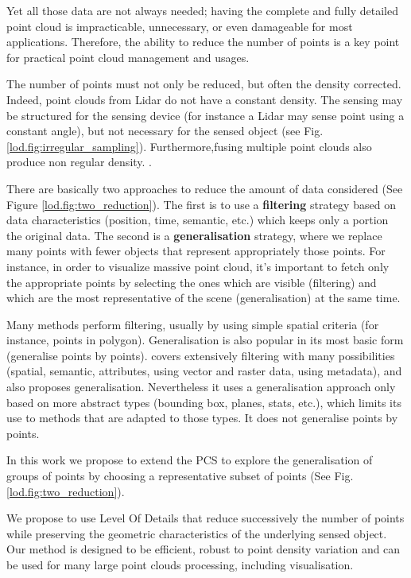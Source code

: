 	Yet all those data are not always needed; having the complete and fully detailed point cloud is impracticable, unnecessary, or even damageable for most applications.
	Therefore, the ability to reduce the number of points is a key point for practical point cloud management and usages.
	
	The number of points must not only be reduced, but often the density corrected.
	Indeed, point clouds from Lidar do not have a constant density.
	The sensing may be structured for the sensing device (for instance a Lidar may sense point using a constant angle), but not necessary for the sensed object (see Fig. \ref{lod.fig:irregular_sampling}). Furthermore,fusing multiple point clouds also produce non regular density.
	.
	
	There are basically two approaches to reduce the amount of data considered (See Figure \ref{lod.fig:two_reduction}).
	The first is to use a \textbf{filtering} strategy based on data characteristics (position, time, semantic, etc.) which keeps only a portion the original data.
	The second is a \textbf{generalisation} strategy, where we replace many points with fewer objects that represent appropriately those points. 
	For instance, in order to visualize massive point cloud, it's important to fetch only the appropriate points by selecting the ones which are visible (filtering) and which are the most representative of the scene (generalisation) at the same time.
	 
	Many methods perform filtering, usually by using simple spatial criteria (for instance, points in polygon).
	Generalisation is also popular in its most basic form (generalise points by points).
	\cite{Cura2015} covers extensively filtering with many possibilities (spatial, semantic, attributes, using vector and raster data, using metadata), and also proposes generalisation.
	Nevertheless it uses a generalisation approach only based on more abstract types (bounding box, planes, stats, etc.), which limits its use to methods that are adapted to those types.
	It does not generalise points by points.
	 
	In this work we propose to extend the PCS to explore the generalisation of groups of points by choosing a representative subset of points (See Fig. \ref{lod.fig:two_reduction}).
	 	
	 
	We propose to use Level Of Details that reduce successively the number of points while preserving the geometric characteristics of the underlying sensed object.
	Our method is designed to be efficient, robust to point density variation and can be used for many large point clouds processing, including visualisation.
	
